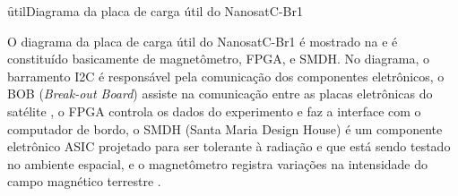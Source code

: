 \f{util}{}{Diagrama da placa de carga útil do NanosatC-Br1}

O diagrama da placa de carga útil do NanosatC-Br1 é mostrado na  e é constituído basicamente de magnetômetro, FPGA, e SMDH. No diagrama, o barramento I2C é responsável pela comunicação dos componentes eletrônicos, o BOB (\textit{Break-out Board}) assiste na comunicação entre as placas eletrônicas do satélite \cite{conceicao2016}, o FPGA controla os dados do experimento e faz a interface com o computador de bordo, o SMDH (Santa Maria Design House) é um componente eletrônico ASIC projetado para ser tolerante à radiação e que está sendo testado no ambiente espacial, e o magnetômetro registra variações na intensidade do campo magnético terrestre
\cite{Couto2019}.


